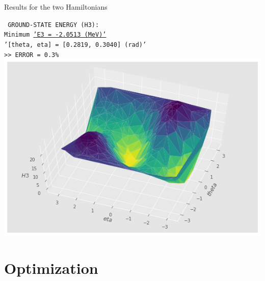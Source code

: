 \documentclass[9pt, handout, aspectratio=169]{beamer}		%
\begin{document}
\begin{frame}{Results for the two Hamiltonians}
\begin{multicols}{2}
			\begin{center}
				\texttt{ \small
					GROUND-STATE ENERGY (H3): \\
					Minimum \underline{'E3 = -2.0513 (MeV)'} \\
					'[theta, eta] = [0.2819, 0.3040] (rad)' \\
					>> ERROR = 0.3\% } \\
				\smallskip
				\includegraphics[height=.40\paperheight]{Figures/h3_result}
			\end{center}

		\end{multicols}

	\end{frame}


\section{Optimization}
\end{document}
